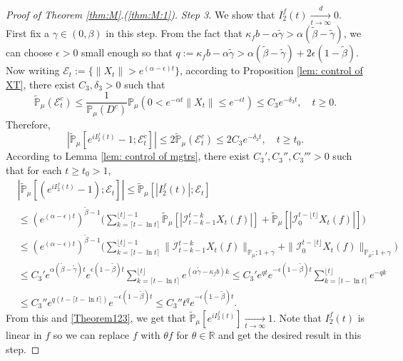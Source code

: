 \documentclass[EJP]{ejpecp} %
\begin{document}
\begin{proof}[Proof of Theorem \ref{thm:M}.(\ref{thm:M:1})]
	\emph{Step 3.} We show that $I^f_2(t)\xrightarrow[t\to \infty]{d} 0$.
  	First fix a $\gamma \in (0,\beta)$ in this step.
  	From the fact that $\kappa_f b -\alpha \tilde \gamma > \alpha (\tilde \beta - \tilde \gamma)$, we can choose $\epsilon >0$ small enough so that $q:=\kappa_fb- \alpha \tilde \gamma  > \alpha (\tilde \beta - \tilde \gamma) + 2\epsilon (1 - \tilde \beta)$.
  	Now writing $\mathcal{E}_t:=\{\|X_t\|>e^{(\alpha-\epsilon) t}\}$, according to Proposition \ref{lem: control of XT}, there exist $C_3, \delta_3>0$ such that
\[
    \mathbb{\widetilde{P}}_{\mu}(\mathcal{E}^c_t)
    \leq \frac{1}{\mathbb{P}_{\mu}(D^c)}\mathbb{P}_{\mu}(0<e^{-\alpha t}\|X_t\|\leq e^{-\epsilon t})\leq C_3e^{-\delta_3 t},
    \quad t\geq0.
\]
  	Therefore,
\begin{equation}
\label{Theorem123}
    |\mathbb{\widetilde{P}}_{\mu}[e^{i I^f_2(t)}-1;\mathcal{E}^c_t]|
    \leq 2\mathbb{\widetilde{P}}_{\mu}(\mathcal{E}^c_t)
    \leq 2C_3e^{-\delta_3 t},
    \quad t\geq t_0.
\end{equation}
	According to Lemma \ref{lem: control of mgtrs}, there exist $C_3',C_3'',C_3'''>0$ such that for each $t\geq t_0 >1$,
\begin{align}
    & |\mathbb{\widetilde{P}}_{\mu} [ (e^{i I^f_2(t)}-1);\mathcal{E}_t]|
   	\leq  \mathbb{\widetilde{P}}_{\mu} [ |I^f_2(t)|;\mathcal{E}_t] \\
    & \leq  ( e^{(\alpha-\epsilon) t} )^{\tilde \beta - 1}\Big(\sum_{k=\lceil t-\ln t \rceil}^{\lfloor t \rfloor - 1}\mathbb{\widetilde{P}}_{\mu} [| \mathcal{I}_{t-k-1}^{t-k} X_t(f) |] + \mathbb{\widetilde{P}}_{\mu}[| \mathcal{I}_{0}^{t-\lfloor t\rfloor} X_t(f)|]\Big) \\
    & \leq ( e^{(\alpha-\epsilon) t} )^{\tilde \beta - 1}\Big(\sum_{k=\lceil t-\ln t \rceil}^{\lfloor t \rfloor - 1}\|\mathcal{I}_{t-k-1}^{t-k} X_t(f) \|_{\mathbb P_\mu; 1+\gamma} + \|\mathcal I_0^{t-\lfloor t \rfloor} X_t(f)\|_{\mathbb P_\mu;1+\gamma}\Big) \\
    & \leq C_3' e^{\alpha (\tilde \beta - \tilde \gamma)t} e ^{\epsilon (1-\tilde \beta) t}\sum_{k=\lceil t-\ln t \rceil}^{\lfloor t \rfloor}  e^{(\alpha\tilde \gamma-\kappa_f b)k}
   	\leq C_3' e^{q t}e^{-\epsilon ( 1 - \tilde \beta)t}\sum_{k=\lceil t-\ln t \rceil}^{\lfloor t \rfloor}  e^{-q k}
    \\ & \leq C_3'' e^{q(t - \lceil t - \ln t\rceil)}e^{-\epsilon(1 - \tilde \beta) t}
 	\leq C_3'' t^q e^{- \epsilon(1 - \tilde \beta) t}.
\end{align}
	From this and \eqref{Theorem123}, we get that $\widetilde {\mathbb P}_\mu[e^{i I^f_2(t)}] \xrightarrow[t\to \infty]{} 1$.
	Note that $I^f_2(t)$ is linear in $f$ so we can replace $f$ with $\theta f$ for $\theta \in \mathbb R$ and get the desired result in this step.


\end{proof}
\end{document}
